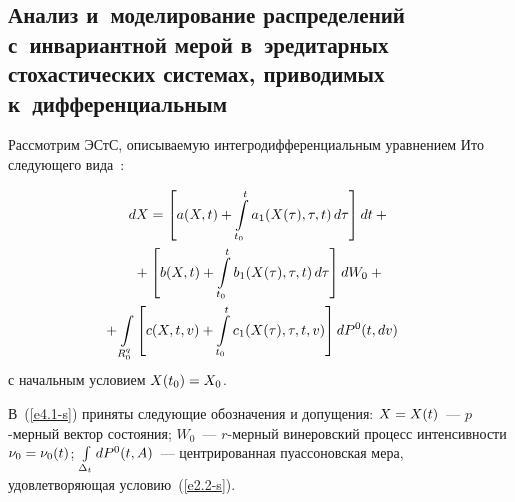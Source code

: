 \begin{multicols}{2}
\vspace*{-20pt}

\section{Анализ и~моделирование распределений с~инвариантной мерой в~эредитарных
стохастических системах,
приводимых к~дифференциальным}

\vspace*{-9pt}
Рассмотрим ЭСтС, описываемую интегродифференциальным уравнением Ито
следующего вида~\cite{21-s}:

\noindent
    \begin{multline}
    d X =\lk a (X,t) +\iii_{t_0}^t a_1 (X(\tau),\tau, t)\, d \tau\rk dt+{}\\
{}+\lk b(X, t) +\iii_{t_0}^t b_1 (X(\tau), \tau, t) \,d \tau\rk dW_0+{}\\
\hspace*{-5mm}{}+\iii_{R_0^q} \lk c(X,t,v) +\iii_{t_0}^t c_1 (X(\tau),  \tau, t,v) \rk
    d P^0 (t, dv)\!\label{e4.1-s}
    \end{multline}
с начальным условием $X(t_0)\hm= X_0$.

В~(\ref{e4.1-s}) приняты следующие обозначения и допущения: $X\hm=X(t)$~---
$p$-мер\-ный вектор состояния;
    $W_0$~--- $r$-мер\-ный винеровский процесс интенсивности $\nu_0 \hm= \nu_0 (t)$;
    $ \int\limits_{\Delta_t} d P^0 (t, A)$~--- центрированная пуассоновская мера,
    удовлетворяющая условию~(\ref{e2.2-s}).


\end{multicols}
